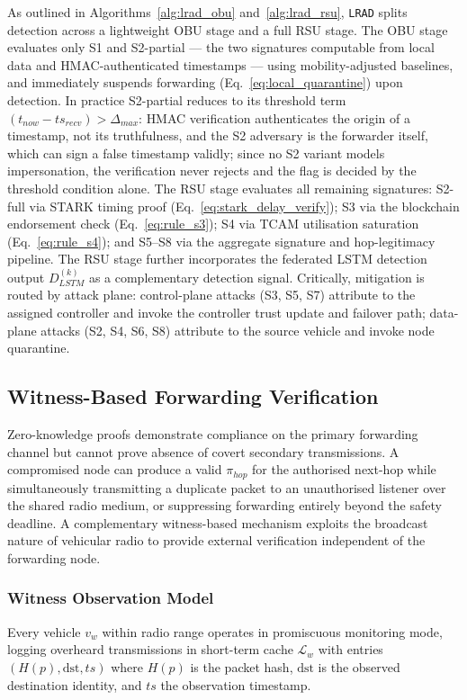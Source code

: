 \documentclass[12pt, a4paper]{report}
\begin{document}
As outlined in Algorithms~\ref{alg:lrad_obu}
and~\ref{alg:lrad_rsu}, \texttt{LRAD} splits
detection across a lightweight \ac{OBU} stage and a
full \ac{RSU} stage. The \ac{OBU} stage evaluates
only S1 and S2-partial --- the two signatures
computable from local data and \ac{HMAC}-authenticated
timestamps --- using mobility-adjusted baselines, and
immediately suspends forwarding (Eq.~\ref{eq:local_quarantine})
upon detection. In practice S2-partial reduces to its
threshold term $(t_{now}-ts_{recv})>\Delta_{max}$: \ac{HMAC}
verification authenticates the origin of a timestamp, not its
truthfulness, and the S2 adversary is the forwarder itself, which
can sign a false timestamp validly; since no S2 variant models
impersonation, the verification never rejects and the flag is
decided by the threshold condition alone. The \ac{RSU} stage evaluates all remaining signatures:
S2-full via \ac{STARK} timing proof
(Eq.~\ref{eq:stark_delay_verify}); S3 via the
blockchain endorsement check
(Eq.~\ref{eq:rule_s3}); S4 via \ac{TCAM}
utilisation saturation (Eq.~\ref{eq:rule_s4}); and
S5--S8 via the aggregate signature and hop-legitimacy
pipeline. The \ac{RSU} stage further incorporates the
federated \ac{LSTM} detection output $D_{LSTM}^{(k)}$
as a complementary detection signal. Critically,
mitigation is routed by attack plane: control-plane
attacks (S3, S5, S7) attribute to the assigned
controller and invoke the controller trust update and
failover path; data-plane attacks (S2, S4, S6, S8)
attribute to the source vehicle and invoke node
quarantine.


\subsection{Witness-Based Forwarding Verification}
\label{sec:witness}

Zero-knowledge proofs demonstrate compliance on the primary
forwarding channel but cannot prove absence of covert
secondary transmissions. A compromised node can produce a
valid $\pi_{hop}$ for the authorised next-hop while
simultaneously transmitting a duplicate packet to an
unauthorised listener over the shared radio medium, or
suppressing forwarding entirely beyond the safety deadline.
A complementary witness-based mechanism exploits the
broadcast nature of vehicular radio to provide external
verification independent of the forwarding node.

\subsubsection{Witness Observation Model}
Every vehicle $v_w$ within radio range operates in
promiscuous monitoring mode, logging overheard transmissions
in short-term cache $\mathcal{L}_w$ with entries
$(H(p), \text{dst}, ts)$ where $H(p)$ is the packet hash,
$\text{dst}$ is the observed destination identity, and
$ts$ the observation timestamp.
\end{document}
